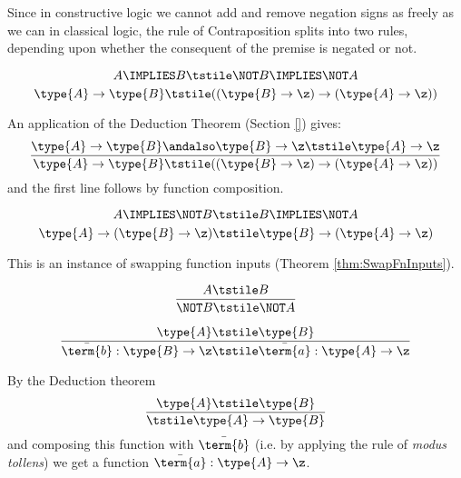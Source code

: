 Since in constructive logic we cannot add and remove negation signs as freely as we can in classical logic, the rule of Contraposition splits into two rules, depending upon whether the consequent of the premise is negated or not.

\begin{Theorem}
\[
A \IMPLIES B
\tstile
\NOT B \IMPLIES \NOT A
\]
\[
\type{A} \to \type{B}
\tstile
((\type{B} \to \z) \to (\type{A} \to \z))
\]
\end{Theorem}
\begin{Proof}
An application of the Deduction Theorem (Section \ref{}) gives:
\[
\frac{
\type{A} \to \type{B}\andalso \type{B} \to \z
\tstile
\type{A} \to \z
}{
\type{A} \to \type{B}
\tstile
((\type{B} \to \z) \to (\type{A} \to \z))
}
\]
and the first line follows by function composition.


%
\end{Proof}


\begin{Theorem}
\[
A \IMPLIES \NOT B
\tstile
B \IMPLIES \NOT A
\]
\[
\type{A} \to (\type{B} \to \z)
\tstile
\type{B} \to (\type{A} \to \z)
\]
\end{Theorem}
\begin{Proof}
This is an instance of swapping function inputs (Theorem \ref{thm:SwapFnInputs}).
\end{Proof}


\begin{Theorem}
\[
\frac{A \tstile B}
{\NOT B \tstile \NOT A}
\]

\[
\frac{\type{A} \tstile \type{B}}
{\bar{\term{b}}:\type{B}\to \z \tstile \bar{\term{a}}:\type{A} \to \z}
\]
\end{Theorem}
\begin{Proof}
By the Deduction theorem
\[
\frac{
\type{A} \tstile \type{B}
}{
\tstile \type{A} \to \type{B}
}
\]
and composing this function with ${\bar{\term{b}}}$ (i.e. by applying the rule of \emph{modus tollens}) we get a function $\bar{\term{a}}:\type{A} \to \z$.
%
\end{Proof}

